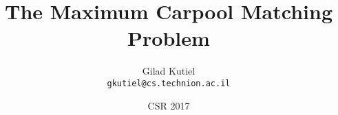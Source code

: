 \title{The Maximum Carpool Matching Problem}
\author{
Gilad Kutiel 
\texorpdfstring{\\
\texttt{gkutiel@cs.technion.ac.il}
}{}}
\date{CSR 2017}
